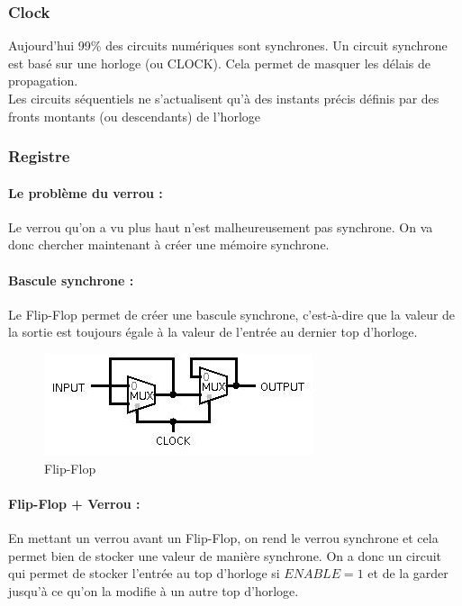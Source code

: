 \documentclass[10pt,a4paper,twoside]{article}
\begin{document}
\subsubsection{Clock}
Aujourd'hui 99\% des circuits numériques sont synchrones. Un circuit synchrone est basé sur une horloge (ou CLOCK). Cela permet de masquer les délais de propagation.\\
Les circuits séquentiels ne s'actualisent qu'à des instants précis définis par des fronts montants (ou descendants) de l'horloge

\subsubsection{Registre}
\paragraph{Le problème du verrou :} Le verrou qu'on a vu plus haut n'est malheureusement pas synchrone. On va donc chercher maintenant à créer une mémoire synchrone.

\paragraph{Bascule synchrone :} Le Flip-Flop permet de créer une bascule synchrone, c'est-à-dire que la valeur de la sortie est toujours égale à la valeur de l'entrée au dernier top d'horloge.

\begin{figure}[hbtp]
\caption{Flip-Flop}
\centering
\includegraphics[scale=1]{FlipFlop.jpg} 
\end{figure}
\FloatBarrier

\paragraph{Flip-Flop + Verrou :} En mettant un verrou avant un Flip-Flop, on rend le verrou synchrone et cela permet bien de stocker une valeur de manière synchrone. On a donc un circuit qui permet de stocker l'entrée au top d'horloge si $ENABLE=1$ et de la garder jusqu'à ce qu'on la modifie à un autre top d'horloge.
\end{document}
